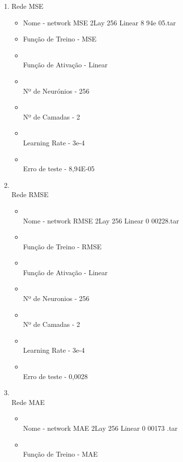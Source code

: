 \documentclass[10pt]{article}
\begin{document}
\begin{enumerate}
\item Rede MSE
  \begin{itemize}
    \item\newline Nome - network MSE 2Lay 256 Linear 8 94e 05.tar
    \item\newline Função de Treino - MSE
    \item\\Função de Ativação - Linear
    \item\\Nº de Neurónios - 256
    \item\\Nº de Camadas - 2
    \item\\Learning Rate - 3e-4
    \item\\Erro de teste - 8,94E-05
  \end{itemize}
  \vspace{2cm}
  \item \\Rede RMSE
  \begin{itemize}
    \item\\Nome - network RMSE 2Lay 256 Linear 0 00228.tar
    \item\\Função de Treino - RMSE
    \item\\Função de Ativação - Linear
    \item\\Nº de Neuronios - 256
    \item\\Nº de Camadas - 2
    \item\\Learning Rate - 3e-4
    \item\\Erro de teste - 0,0028
  \end{itemize}  
  \vspace{2cm}
  \item\\Rede MAE
  \begin{itemize} 
    \item\\Nome - network MAE 2Lay 256 Linear 0 00173 .tar
    \item\\Função de Treino - MAE

\end{itemize}
\end{enumerate}
\end{document}
